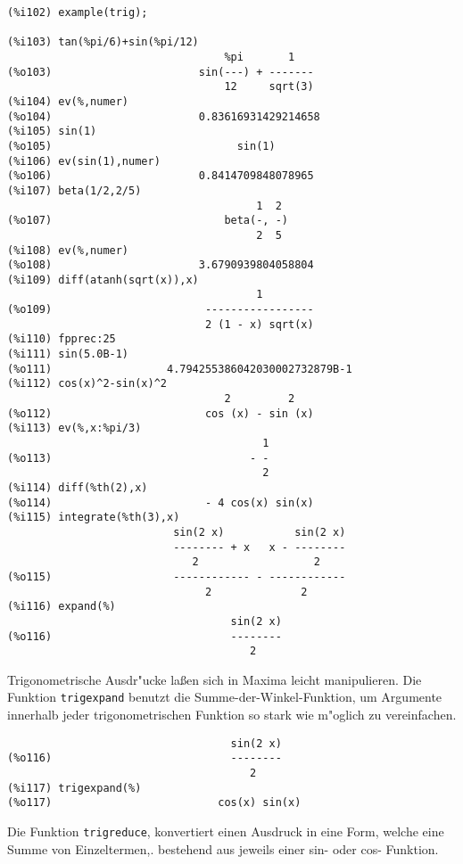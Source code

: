\documentclass[spanish,12pt,a4paper]{article}
\begin{document}
\scriptsize
\begin{verbatim}
(%i102) example(trig);

(%i103) tan(%pi/6)+sin(%pi/12)
                                  %pi       1
(%o103)                       sin(---) + -------
                                  12     sqrt(3)
(%i104) ev(%,numer)
(%o104)                       0.83616931429214658
(%i105) sin(1)
(%o105)                             sin(1)
(%i106) ev(sin(1),numer)
(%o106)                       0.8414709848078965
(%i107) beta(1/2,2/5)
                                       1  2
(%o107)                           beta(-, -)
                                       2  5
(%i108) ev(%,numer)
(%o108)                       3.6790939804058804
(%i109) diff(atanh(sqrt(x)),x)
                                       1
(%o109)                        -----------------
                               2 (1 - x) sqrt(x)
(%i110) fpprec:25
(%i111) sin(5.0B-1)
(%o111)                  4.794255386042030002732879B-1
(%i112) cos(x)^2-sin(x)^2
                                  2         2
(%o112)                        cos (x) - sin (x)
(%i113) ev(%,x:%pi/3)
                                        1
(%o113)                               - -
                                        2
(%i114) diff(%th(2),x)
(%o114)                        - 4 cos(x) sin(x)
(%i115) integrate(%th(3),x)
                          sin(2 x)           sin(2 x)
                          -------- + x   x - --------
                             2                  2
(%o115)                   ------------ - ------------
                               2              2
(%i116) expand(%)
                                   sin(2 x)
(%o116)                            --------
                                      2
\end{verbatim}
\normalsize

Trigonometrische Ausdr"ucke la{\ss}en sich in Maxima leicht manipulieren. Die Funktion \verb|trigexpand| benutzt die Summe-der-Winkel-Funktion, um Argumente innerhalb jeder trigonometrischen Funktion so stark wie m"oglich zu vereinfachen.

\scriptsize
\begin{verbatim}
                                   sin(2 x)
(%o116)                            --------
                                      2
(%i117) trigexpand(%)
(%o117)                          cos(x) sin(x)
\end{verbatim}
\normalsize

Die Funktion \verb|trigreduce|, konvertiert einen Ausdruck in eine Form, welche eine Summe von Einzeltermen,. bestehend aus jeweils einer sin- oder cos- Funktion.
\end{document}
